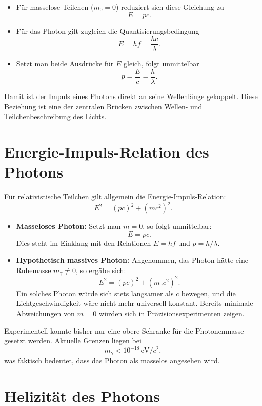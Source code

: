 \begin{itemize}
	\item Für masselose Teilchen ($m_0 = 0$) reduziert sich diese Gleichung zu
	\[
	E = p c.
	\]
	
	\item Für das Photon gilt zugleich die Quantisierungsbedingung
	\[
	E = h f = \frac{h c}{\lambda}.
	\]
	
	\item Setzt man beide Ausdrücke für $E$ gleich, folgt unmittelbar
	\[
	p = \frac{E}{c} = \frac{h}{\lambda}.
	\]
\end{itemize}

\noindent
Damit ist der Impuls eines Photons direkt an seine Wellenlänge gekoppelt. Diese Beziehung ist eine der zentralen Brücken zwischen Wellen- und Teilchenbeschreibung des Lichts.

\section{Energie-Impuls-Relation des Photons}
\label{anhangA:masse}

Für relativistische Teilchen gilt allgemein die Energie-Impuls-Relation:
\[
E^2 = (pc)^2 + (m c^2)^2.
\]

\begin{itemize}
	\item \textbf{Masseloses Photon:}  
	Setzt man $m=0$, so folgt unmittelbar:
	\[
	E = p c.
	\]
	Dies steht im Einklang mit den Relationen $E = h f$ und $p = h/\lambda$.
	
	\item \textbf{Hypothetisch massives Photon:}  
	Angenommen, das Photon hätte eine Ruhemasse $m_\gamma \neq 0$, so ergäbe sich:
	\[
	E^2 = (p c)^2 + (m_\gamma c^2)^2.
	\]
	Ein solches Photon würde sich stets langsamer als $c$ bewegen, und die Lichtgeschwindigkeit wäre nicht mehr universell konstant. 
	Bereits minimale Abweichungen von $m=0$ würden sich in Präzisionsexperimenten zeigen.
\end{itemize}

Experimentell konnte bisher nur eine obere Schranke für die Photonenmasse gesetzt werden. Aktuelle Grenzen liegen bei
\[
m_\gamma < 10^{-18}\,\text{eV}/c^2,
\]
was faktisch bedeutet, dass das Photon als masselos angesehen wird.

\section{Helizität des Photons}
\label{anhangA:helizitaet}

